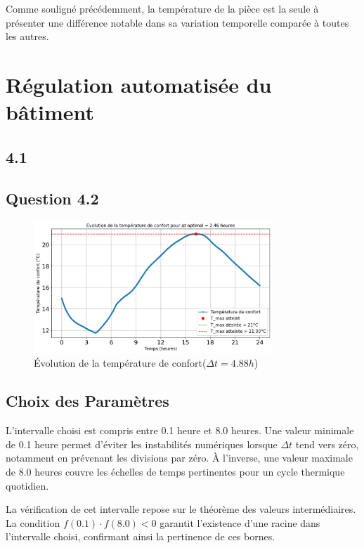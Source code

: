 \documentclass[12pt]{article}
\begin{document}
        Comme souligné précédemment, la température de la pièce est la seule à présenter une différence notable dans sa variation temporelle comparée à toutes les autres.

\section{Régulation automatisée du bâtiment}

\subsection{4.1}


\subsection{Question 4.2}
\begin{figure}
    \centering
    \includegraphics[width=0.8\textwidth]{Rapport/figures/T_confort_optimal.png} %
    \caption{Évolution de la température de confort($\Delta t = 4.88h$)}
    \label{fig:temperature_confort}
\end{figure}
\vspace{0.5cm}
\subsection{Choix des Paramètres}

L'intervalle choisi est compris entre 0.1 heure et 8.0 heures. Une valeur minimale de 0.1 heure permet d'éviter les instabilités numériques lorsque $\Delta t$ tend vers zéro, notamment en prévenant les divisions par zéro. À l'inverse, une valeur maximale de 8.0 heures couvre les échelles de temps pertinentes pour un cycle thermique quotidien.

La vérification de cet intervalle repose sur le théorème des valeurs intermédiaires. La condition $f(0.1) \cdot f(8.0) < 0$ garantit l'existence d'une racine dans l'intervalle choisi, confirmant ainsi la pertinence de ces bornes.
\end{document}
